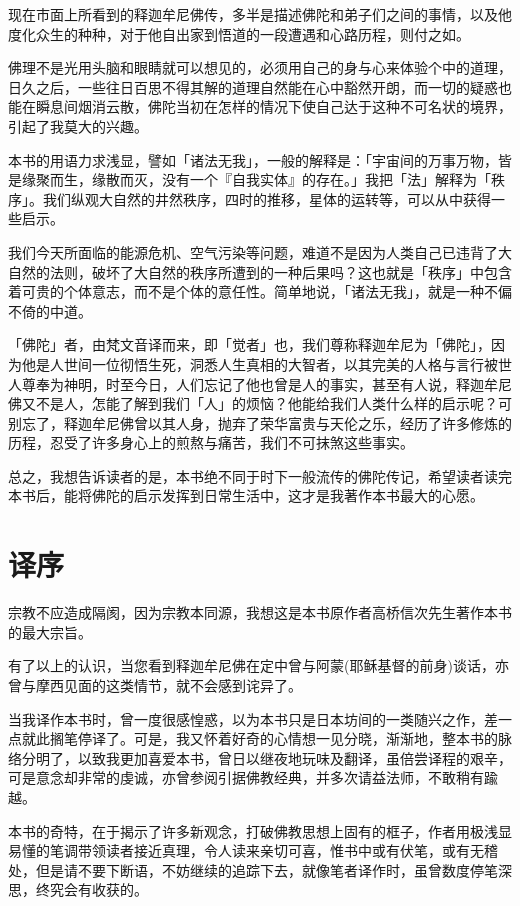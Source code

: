 \documentclass[12pt,twoside,openany]{book}
\begin{document}
现在市面上所看到的释迦牟尼佛传，多半是描述佛陀和弟子们之间的事情，以及他度化众生的种种，对于他自出家到悟道的一段遭遇和心路历程，则付之如。

佛理不是光用头脑和眼睛就可以想见的，必须用自己的身与心来体验个中的道理，日久之后，一些往日百思不得其解的道理自然能在心中豁然开朗，而一切的疑惑也能在瞬息间烟消云散，佛陀当初在怎样的情况下使自己达于这种不可名状的境界，引起了我莫大的兴趣。

本书的用语力求浅显，譬如「诸法无我」，一般的解释是：「宇宙间的万事万物，皆是缘聚而生，缘散而灭，没有一个『自我实体』的存在。」我把「法」解释为「秩序」。我们纵观大自然的井然秩序，四时的推移，星体的运转等，可以从中获得一些启示。

我们今天所面临的能源危机、空气污染等问题，难道不是因为人类自己已违背了大自然的法则，破坏了大自然的秩序所遭到的一种后果吗？这也就是「秩序」中包含着可贵的个体意志，而不是个体的意任性。简单地说，「诸法无我」，就是一种不偏不倚的中道。

「佛陀」者，由梵文音译而来，即「觉者」也，我们尊称释迦牟尼为「佛陀」，因为他是人世间一位彻悟生死，洞悉人生真相的大智者，以其完美的人格与言行被世人尊奉为神明，时至今日，人们忘记了他也曾是人的事实，甚至有人说，释迦牟尼佛又不是人，怎能了解到我们「人」的烦恼？他能给我们人类什么样的启示呢？可别忘了，释迦牟尼佛曾以其人身，抛弃了荣华富贵与天伦之乐，经历了许多修炼的历程，忍受了许多身心上的煎熬与痛苦，我们不可抹煞这些事实。

总之，我想告诉读者的是，本书绝不同于时下一般流传的佛陀传记，希望读者读完本书后，能将佛陀的启示发挥到日常生活中，这才是我著作本书最大的心愿。


\chapter*{译序}
宗教不应造成隔阂，因为宗教本同源，我想这是本书原作者高桥信次先生著作本书的最大宗旨。

有了以上的认识，当您看到释迦牟尼佛在定中曾与阿蒙(耶稣基督的前身)谈话，亦曾与摩西见面的这类情节，就不会感到诧异了。

当我译作本书时，曾一度很感惶惑，以为本书只是日本坊间的一类随兴之作，差一点就此搁笔停译了。可是，我又怀着好奇的心情想一见分晓，渐渐地，整本书的脉络分明了，以致我更加喜爱本书，曾日以继夜地玩味及翻译，虽倍尝译程的艰辛，可是意念却非常的虔诚，亦曾参阅引据佛教经典，并多次请益法师，不敢稍有踰越。

本书的奇特，在于揭示了许多新观念，打破佛教思想上固有的框子，作者用极浅显易懂的笔调带领读者接近真理，令人读来亲切可喜，惟书中或有伏笔，或有无稽处，但是请不要下断语，不妨继续的追踪下去，就像笔者译作时，虽曾数度停笔深思，终究会有收获的。
\end{document}
